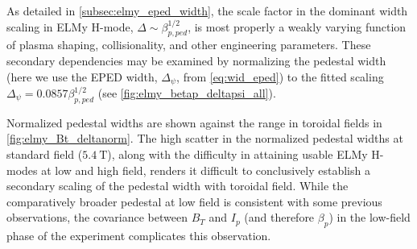\begin{figure}
 \pushtooutside
\end{figure}

\noindent{}

As detailed in \cref{subsec:elmy_eped_width}, the scale factor in the dominant width scaling in ELMy H-mode, $\Delta \sim \beta_{p,ped}^{1/2}$, is most properly a weakly varying function of plasma shaping, collisionality, and other engineering parameters.  These secondary dependencies may be examined by normalizing the pedestal width (here we use the EPED width, $\Delta_\psi$, from \cref{eq:wid_eped}) to the fitted scaling $\Delta_\psi = 0.0857 \beta_{p,ped}^{1/2}$ (see \cref{fig:elmy_betap_deltapsi_all}).  

Normalized pedestal widths are shown against the range in toroidal fields in \cref{fig:elmy_Bt_deltanorm}.  The high scatter in the normalized pedestal widths at standard field ($\SI{5.4}{\tesla}$), along with the difficulty in attaining usable ELMy H-modes at low and high field, renders it difficult to conclusively establish a secondary scaling of the pedestal width with toroidal field.  While the comparatively broader pedestal at low field is consistent with some previous observations, the covariance between $B_T$ and $I_p$ (and therefore $\beta_p$) in the low-field phase of the experiment complicates this observation.

